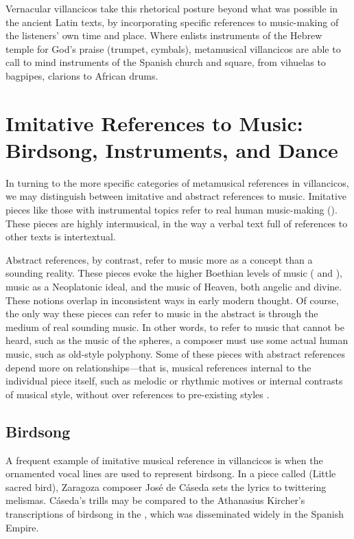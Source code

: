 Vernacular villancicos take this rhetorical posture beyond what was possible in 
the ancient Latin texts, by incorporating specific references to music-making 
of the listeners' own time and place.  
Where  enlists instruments of the Hebrew temple for God's 
praise (trumpet, cymbals), metamusical villancicos are able to call to mind 
instruments of the Spanish church and square, from vihuelas to bagpipes, 
clarions to African drums.

\section{Imitative References to Music: Birdsong, Instruments, and Dance}

In turning to the more specific categories of metamusical references in 
villancicos, we may distinguish between imitative and abstract references to 
music. 
Imitative pieces like those with instrumental topics refer to real human 
music-making ().
These pieces are highly intermusical, in the way a verbal text full of 
references to other texts is intertextual.

Abstract references, by contrast, refer to music more as a concept than a 
sounding reality.
These pieces evoke the higher Boethian levels of music ( 
and ), music as a Neoplatonic ideal, and the music of Heaven, 
both angelic and divine.
These notions overlap in inconsistent ways in early modern thought.
Of course, the only way these pieces can refer to music in the abstract is 
through the medium of real sounding music.
In other words, to refer to music that cannot be heard, such as the music of 
the spheres, a composer must use some actual human music, such as old-style 
polyphony.
Some of these pieces with abstract references depend more on 
 relationships---that is, musical references internal to 
the individual piece itself, such as melodic or rhythmic motives or internal 
contrasts of musical style, without over references to pre-existing styles 
.

\subsection{Birdsong}

A frequent example of imitative musical reference in villancicos is when the 
ornamented vocal lines are used to represent birdsong.
In a piece called  (Little sacred bird), Zaragoza
composer José de Cáseda sets the lyrics 
to twittering melismas.%
Cáseda's trills may be compared to the Athanasius Kircher's transcriptions of 
birdsong in the , which was disseminated widely 
in the Spanish Empire.%
  \autocite[30, Iconismus III]{Kircher:Musurgia}

